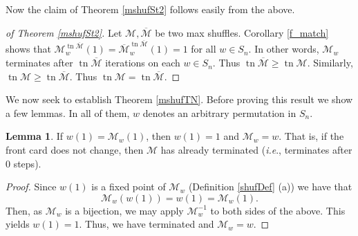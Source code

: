 \documentclass[final,nomarks]{dmtcs-episciences}
\theoremstyle{definition}
\newtheorem{lem}[thm]{Lemma}
\theoremstyle{definition}
\theoremstyle{remark}
\newcommand{\M}{\mathcal{M}} %
\newcommand{\Mo}{\overline{\mathcal{M}}} %
\newcommand{\Mw}{\mathcal{M}_w} %
\newcommand{\Mow}{\Mo_w} %
\newcommand{\tn}{\operatorname{tn }} %
\begin{document}
Now the claim of Theorem \ref{mshufSt2} follows easily from the above.

\begin{proof}[of Theorem \ref{mshufSt2}]
    Let $\M,\Mo$ be two max shuffles. Corollary \ref{f_match} shows that $\Mw^{\tn \Mo}(1) = \Mow^{\tn \Mo}(1) = 1$ for all $w \in S_n$. In other words, $\Mw$ terminates after $\tn \Mo$ iterations on each $w \in S_n$.    
    Thus $\tn \Mo \ge \tn \M$. Similarly, $\tn \M \ge \tn \Mo$. Thus $\tn \M = \tn \Mo$.
\end{proof}


We now seek to establish Theorem \ref{mshufTN}. Before proving this result we show a few lemmas. In all of them, $w$ denotes an arbitrary permutation in $S_n$.

\begin{lem}
\label{max-term-lem1}
    If $w(1) = \Mw(1)$, then $w(1)=1$ and $\Mw = w$.
    That is, if the front card does not change, then $\M$ has already terminated (\textit{i.e}., terminates after $0$ steps).
\end{lem}

\begin{proof}
    Since $w(1)$ is a fixed point of $\Mw$ (Definition \ref{shufDef} (a)) we have that
    \[
    \Mw(w(1)) = w(1) = \Mw(1).
    \]
    Then, as $\Mw$ is a bijection, we may apply $\Mw^{-1}$ to both sides of the above. This yields $w(1)=1$.  Thus, we have terminated and $\Mw = w$.
\end{proof}
\end{document}
